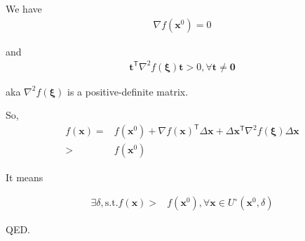\documentclass[11pt,letter,notitlepage]{article}
\begin{document}
\begin{exercise}

  We have
  \begin{align}
    \nabla f(\bm{x}^0) = 0
  \end{align}

  and
  \begin{align}
    \bm{t}^\mathsf{T}\nabla^2f(\bm{\xi})\bm{t} > 0, \forall
    \bm{t} \neq \bm{0}
  \end{align}

  aka $\nabla^2f(\bm{\xi})$ is a positive-definite matrix.

  So,
  \begin{align}
    f(\bm{x}) = & f(\bm{x}^0) + \nabla{f(\bm{x})}^\mathsf{T}
    \Delta \bm{x} + \Delta \bm{x}^\mathsf{T}\nabla^2f(\bm{\xi})\Delta \bm{x}\\
    > & f(\bm{x}^0)
  \end{align}

  It means

  \begin{align}
    \exists\delta, \mathrm{s.t.}f(\bm{x}) > & f(\bm{x}^0), \forall \bm{x} \in U^\circ(\bm{x}^0, \delta)
  \end{align}

  QED.
\end{exercise}
\end{document}
